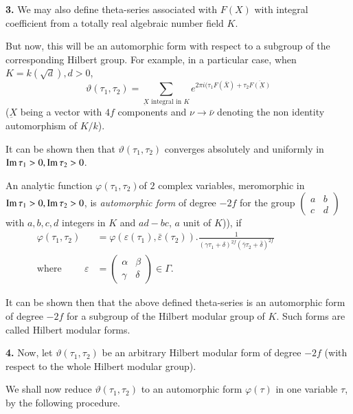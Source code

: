 \textbf{3.} We may also define theta-series associated with $F(X)$ with
integral coefficient from a totally real algebraic number field $K$. 

But now, this will be an automorphic form with respect to a subgroup
of the corresponding Hilbert group. For example, in a particular case,
when $K =k(\sqrt{d}), d > 0$, 
$$
\vartheta(\tau_1, \tau_2) = \sum_{\underbar{X} \text{ integral in
  }K}e^{2 \pi i (\tau_1 F (\bar{X})+ \tau_2 \overline{F
    (\underbar{X})}} 
$$
($\underbar{X}$ being a vector with $4f$ components and $\nu \to
\bar{\nu}$ denoting the non identity automorphism of $K/k$). 

It can be shown then that $\vartheta(\tau_1, \tau_2)$ converges
absolutely and uniformly in $\operatorname{Im} \tau_1 > 0, \operatorname{Im}  \tau_2 > 0$. 
\begin{defi*}
  An analytic function $\varphi (\tau_1, \tau_2)$of $2$ complex
  variables, meromorphic in $\operatorname{Im} \tau_1 > 0, \operatorname{Im}  \tau_2 > 0$, is {\em
    automorphic form} of degree $-2f$ for the group $\begin{pmatrix} a
    & b \\ c & d \end{pmatrix}$ with $a, b, c, d$ integers in $K$ and\pageoriginale
  $ad - bc$, $a$ unit of $K$)), if  
  \begin{align*}
    \varphi (\tau_1, \tau_2) & =\varphi (\varepsilon (\tau_1),
    \bar{\varepsilon} (\tau_2)). \frac{1}{(\gamma \tau_1 +
      \delta)^{2f} (\bar{\gamma} \tau_2 + \bar{\delta})^{2f}}\hspace{2cm}\\ 
    \text{where}\hspace{1cm}\varepsilon & = \begin{pmatrix} \alpha & \beta
      \\ \gamma & \delta \end{pmatrix} \in \Gamma. 
  \end{align*}
\end{defi*}

It can be shown then that the above defined theta-series is an
automorphic form of degree $-2f$ for a subgroup of the Hilbert
modular group of $K$. Such forms are called Hilbert modular forms. 

\textbf{4.} Now, let $\vartheta (\tau_1, \tau_2)$ be an arbitrary Hilbert
modular form of degree $-2f$ (with respect to the whole Hilbert
modular group). 

We shall now reduce $\vartheta (\tau_1, \tau_2)$ to an automorphic
form $\varphi (\tau)$ in one variable $\tau$, by the following
procedure. 

